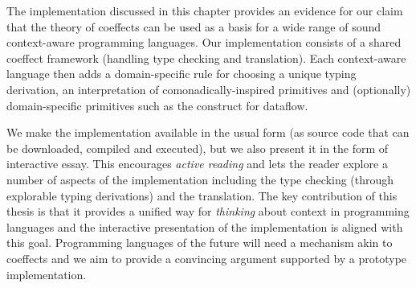 The implementation discussed in this chapter provides an evidence for our claim that the
theory of coeffects can be used as a basis for a wide range of sound context-aware programming
languages. Our implementation consists of a shared coeffect framework (handling type checking and
translation). Each context-aware language then adds a domain-specific rule for choosing a unique
typing derivation, an interpretation of comonadically-inspired primitives and (optionally)
domain-specific primitives such as the  construct for dataflow.

We make the implementation available in the usual form (as source code that can be downloaded,
compiled and executed), but we also present it in the form of interactive essay. This encourages
\emph{active reading} and lets the reader explore a number of aspects of the implementation
including the type checking (through explorable typing derivations) and the translation. The key
contribution of this thesis is that it provides a unified way for \emph{thinking} about context in
programming languages and the interactive presentation of the implementation is aligned with this
goal. Programming languages of the future will need a mechanism akin to coeffects and we aim to
provide a convincing argument supported by a prototype implementation.
